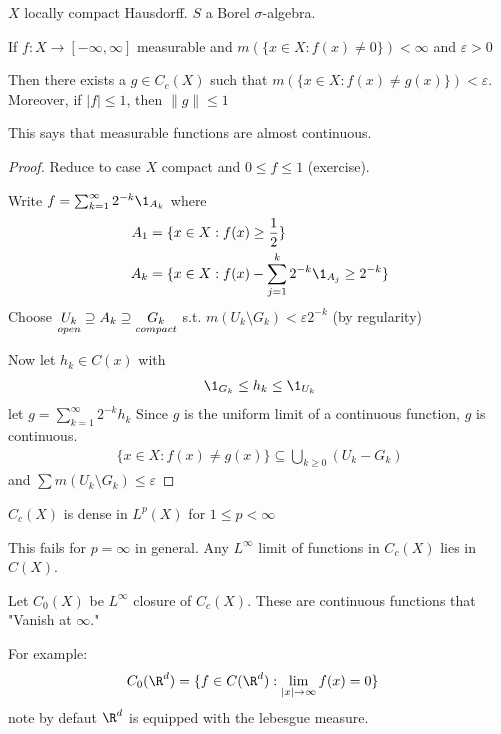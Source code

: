 $X$ locally compact Hausdorff. $S$ a Borel $\sigma$-algebra.

 
 \begin{theorem}[Lusin]
	 If $f: X \to [-\infty, \infty]$  measurable and $m(\{x \in X : f(x) \neq 0 \} ) < \infty$ and  $\varepsilon > 0$

	 Then there exists a $g \in C_{c} (X) $ such that $m( \{ x \in X : f(x) \neq g(x) \} ) < \varepsilon$.
	 Moreover, if $|f| \leq 1$, then $ \|g\| \leq 1$
 \end{theorem}
 
 \begin{remark}
 	This says that measurable functions are almost continuous.
 \end{remark}
 
\begin{proof}
	Reduce to case $X$ compact and $0 \leq f \leq 1$ (exercise).

	Write $f = \sum_{k=1}^{\infty} 2^{-k} \1_{A_{k}}$ where 
	\begin{align*}
		A_{1} &= \{ x \in X : f(x) \geq \frac{1}{2} \} \\
		A_{k} &= \{ x \in X : f(x) - \sum_{j=1}^{k} 2^{-k} \1_{A_{j}} \geq 2^{-k} \}
	\end{align*}
	Choose $\underset{open}{U_{k}} \supseteq A_{k} \supseteq \underset{compact}{G_{k}}$
	s.t. $m(U_{k} \setminus G_{k}) < \varepsilon 2^{-k}$ (by regularity)

	Now let $h_{k} \in C (x)$ with
	\begin{align*}
		\1_{G_{k}} \leq h_{k} \leq \1_{U_{k}}
	\end{align*} 
	let $g = \sum_{k=1}^{\infty} 2^{-k}h_{k}$
	Since $g$ is the uniform limit of a continuous function, $g$ is continuous.
	\begin{align*}
		\{ x \in X : f(x) \neq g(x) \} \subseteq \bigcup_{k \geq 0} ( U_{k} - G_{k} )
	\end{align*} and
	$\sum m( U_{k} \setminus G_{k} ) \leq \varepsilon$
\end{proof}
 
\begin{corollary}
	$C_c (X)$ is dense in $L^{p} (X)$ for $1 \leq p < \infty$
\end{corollary}

\begin{remark}
	This fails for $p = \infty$ in general.
	Any $L^{\infty}$ limit of functions in $C_c (X)$ lies in $C (X)$.
\end{remark}

Let $C_{0} (X)$ be $L^{\infty}$ closure of $C_c (X)$. These are continuous functions that "Vanish at $\infty$."

For example:
\begin{align*}
	C_{0} (\R^d ) &= \{ f\in C (\R^{d}) : \lim_{|x| \to \infty } f(x) = 0 \}
\end{align*} note by defaut $\R^{d}$ is equipped with the lebesgue measure.
